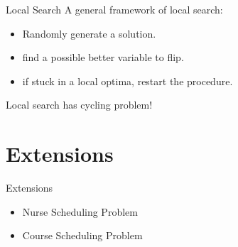 \begin{frame}[t]{Local Search}
  A general framework of local search:
  \begin{itemize}
    \item Randomly generate a solution.
    \item find a possible better variable to flip.
    \item if stuck in a local optima, restart the procedure.
  \end{itemize}

  Local search has cycling problem!
\end{frame}

\section{Extensions}
\begin{frame}[t]{Extensions}
  \begin{itemize}[<+->]
    \item Nurse Scheduling Problem
    \item Course Scheduling Problem
  \end{itemize}
\end{frame}

